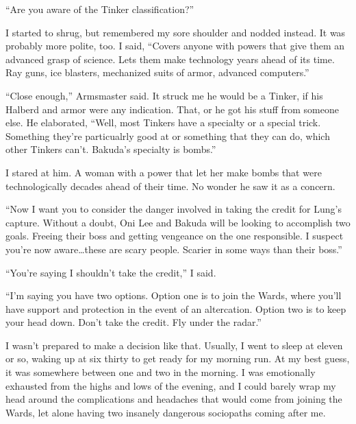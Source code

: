 ``Are you aware of the Tinker classification?''



I started to shrug, but remembered my sore shoulder and nodded instead.  It was probably more polite, too.  I said, ``Covers anyone with powers that give them an advanced grasp of science.  Lets them make technology years ahead of its time.  Ray guns, ice blasters, mechanized suits of armor, advanced computers.''



``Close enough,'' Armsmaster said.  It struck me he would be a Tinker, if his Halberd and armor were any indication.  That, or he got his stuff from someone else.  He elaborated,  ``Well, most Tinkers have a specialty or a special trick.  Something they're particualrly good at or something that they can do, which other Tinkers can't.  Bakuda's specialty is bombs.''



I stared at him.  A woman with a power that let her make bombs that were technologically decades ahead of their time.  No wonder he saw it as a concern.



``Now I want you to consider the danger involved in taking the credit for Lung's capture.  Without a doubt, Oni Lee and Bakuda will be looking to accomplish two goals.  Freeing their boss and getting vengeance on the one responsible.  I suspect you're now aware\ldots these are scary people.  Scarier in some ways than their boss.''



``You're saying I shouldn't take the credit,'' I said.



``I'm saying you have two options.  Option one is to join the Wards, where you'll have support and protection in the event of an altercation.  Option two is to keep your head down.  Don't take the credit.  Fly under the radar.''



I wasn't prepared to make a decision like that.  Usually, I went to sleep at eleven or so, waking up at six thirty to get ready for my morning run.  At my best guess, it was somewhere between one and two in the morning.  I was emotionally exhausted from the highs and lows of the evening, and I could barely wrap my head around the complications and headaches that would come from joining the Wards, let alone having two insanely dangerous sociopaths coming after me.



